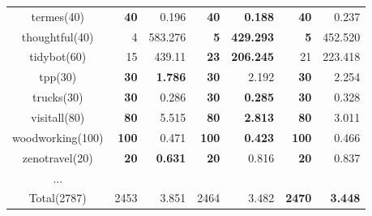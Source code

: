 \begin{center}
\begin{tabular}{c rr rr rr}
    termes(40)      & \textbf{40}   & 0.196             & \textbf{40}   & \textbf{0.188}      & \textbf{40}   & 0.237 \\
    thoughtful(40)  & 4             & 583.276           & \textbf{5}    & \textbf{429.293}    & \textbf{5}    & 452.520 \\
    tidybot(60)     & 15            & 439.11            & \textbf{23}   & \textbf{206.245}    & 21            & 223.418 \\
    tpp(30)         & \textbf{30}   & \textbf{1.786}    & \textbf{30}   & 2.192               & \textbf{30}   & 2.254 \\
    trucks(30)      & \textbf{30}   & 0.286             & \textbf{30}   & \textbf{0.285}      & \textbf{30}   & 0.328\\
    visitall(80)    & \textbf{80}   & 5.515             & \textbf{80}   & \textbf{2.813}      & \textbf{80}   & 3.011 \\
    woodworking(100)& \textbf{100}  & 0.471             & \textbf{100}  & \textbf{0.423}      & \textbf{100}  & 0.466 \\
    zenotravel(20)  & \textbf{20}   & \textbf{0.631}    & \textbf{20}   & 0.816               & \textbf{20}   & 0.837 \\
    ...\\
    \midrule
    Total(2787) & 2453 & 3.851 & 2464 & 3.482 & \textbf{2470} & \textbf{3.448} \\
    \bottomrule
 \end{tabular}
\end{center}